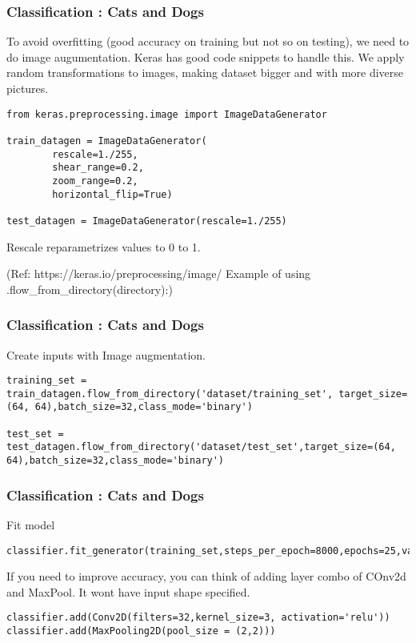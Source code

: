 \begin{frame}[fragile] \frametitle{Classification : Cats and Dogs}
To avoid overfitting (good accuracy on training but not so on testing), we need to do image augumentation.
Keras has good code snippets to handle this. We apply random transformations to images, making dataset bigger and with more diverse pictures.
\begin{lstlisting}
from keras.preprocessing.image import ImageDataGenerator

train_datagen = ImageDataGenerator(
        rescale=1./255,
        shear_range=0.2,
        zoom_range=0.2,
        horizontal_flip=True)

test_datagen = ImageDataGenerator(rescale=1./255)
\end{lstlisting}
Rescale reparametrizes values to 0 to 1.


(Ref: https://keras.io/preprocessing/image/   Example of using .flow\_from\_directory(directory):)
\end{frame}

\begin{frame}[fragile] \frametitle{Classification : Cats and Dogs}
Create inputs with Image augmentation.
\begin{lstlisting}
training_set = train_datagen.flow_from_directory('dataset/training_set', target_size=(64, 64),batch_size=32,class_mode='binary')

test_set = test_datagen.flow_from_directory('dataset/test_set',target_size=(64, 64),batch_size=32,class_mode='binary')

\end{lstlisting}

\end{frame}


\begin{frame}[fragile] \frametitle{Classification : Cats and Dogs}
Fit model
\begin{lstlisting}
classifier.fit_generator(training_set,steps_per_epoch=8000,epochs=25,validation_data=test_set,validation_steps=2000)
\end{lstlisting}
If you need to improve accuracy, you can think of adding layer combo of COnv2d and MaxPool. It wont have input shape specified.
\begin{lstlisting}
classifier.add(Conv2D(filters=32,kernel_size=3, activation='relu'))
classifier.add(MaxPooling2D(pool_size = (2,2)))
\end{lstlisting}

\end{frame}

